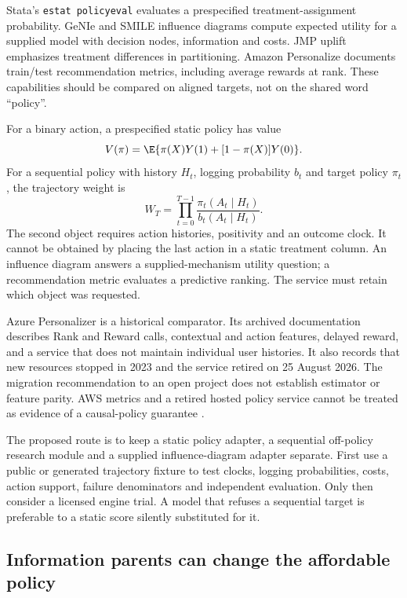 Stata's \texttt{estat policyeval} evaluates a prespecified treatment-assignment
probability. GeNIe and SMILE influence diagrams compute expected utility for a
supplied model with decision nodes, information and costs. JMP uplift emphasizes
treatment differences in partitioning. Amazon Personalize documents train/test
recommendation metrics, including average rewards at rank. These capabilities
should be compared on aligned targets, not on the shared word ``policy''.

For a binary action, a prespecified static policy has value
\begin{equation}
 V(\pi)=\E\{\pi(X)Y(1)+[1-\pi(X)]Y(0)\}.
 \label{exec17:s8-static-value}
\end{equation}
For a sequential policy with history $H_t$, logging probability $b_t$ and
target policy $\pi_t$, the trajectory weight is
\begin{equation}
 W_T=\prod_{t=0}^{T-1}\frac{\pi_t(A_t\mid H_t)}{b_t(A_t\mid H_t)}.
 \label{exec17:s8-sequential-value}
\end{equation}
The second object requires action histories, positivity and an outcome clock.
It cannot be obtained by placing the last action in a static treatment column.
An influence diagram answers a supplied-mechanism utility question; a
recommendation metric evaluates a predictive ranking. The service must retain
which object was requested.

Azure Personalizer is a historical comparator. Its archived documentation
describes Rank and Reward calls, contextual and action features, delayed reward,
and a service that does not maintain individual user histories. It also records
that new resources stopped in 2023 and the service retired on 25 August 2026.
The migration recommendation to an open project does not establish estimator
or feature parity. AWS metrics and a retired hosted policy service cannot be
treated as evidence of a causal-policy guarantee
\citep{exec16_cp_azure,exec16_cp_aws}.

The proposed route is to keep a static policy adapter, a sequential off-policy
research module and a supplied influence-diagram adapter separate. First use a
public or generated trajectory fixture to test clocks, logging probabilities,
costs, action support, failure denominators and independent evaluation. Only
then consider a licensed engine trial. A model that refuses a sequential target
is preferable to a static score silently substituted for it.

\subsection{Information parents can change the affordable policy}
\label{exec17:s8-information}

